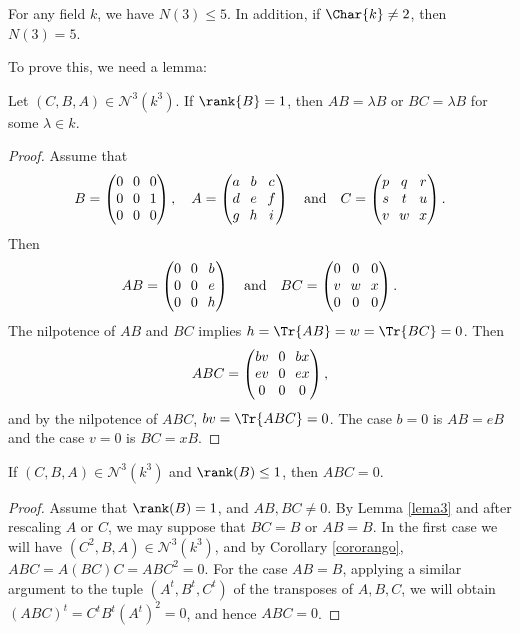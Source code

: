 \begin{prop}\label{casotres}
For any field $k$, we have $N(3)\leq 5$. In addition, if $\Char{k}\neq 2$, then $N(3)=5$.
\end{prop}
To prove this, we need a lemma:
\begin{lema}\label{lema3}
Let $(C,B,A)\in \mathcal{N}^{3}(k^{3})$. If $\rank{B}=1$, then $AB=\lambda B$ or $BC=\lambda B$ for some $\lambda \in k$.
\end{lema}
\begin{proof}
Assume that
\[\arraycolsep3.5pt
B=\begin{pmatrix}
0 & 0 & 0\\
0 & 0 & 1\\
0 & 0 & 0\\
\end{pmatrix},\quad A=\begin{pmatrix}
a & b & c\\
d & e & f\\
g & h & i\\
\end{pmatrix}\quad\text{and}\quad C=\begin{pmatrix}
p & q & r\\
s & t & u\\
v & w & x\\
\end{pmatrix}. 
\]
Then
\[\arraycolsep3.5pt
AB=\begin{pmatrix}
0 & 0 & b\\
0 & 0 & e\\
0 & 0 & h\\
\end{pmatrix}\quad\text{and}\quad BC=\begin{pmatrix}
0 & 0 & 0\\
v & w & x\\
0 & 0 & 0\\
\end{pmatrix}.
\]
The nilpotence of $AB$ and $BC$ implies $h=\Tr{AB}=w=\Tr{BC}=0$. Then
\[\arraycolsep3.5pt
ABC=\begin{pmatrix}
bv & 0 & bx\\
ev & 0 & ex\\
0 & 0 & 0\\
\end{pmatrix},
\]
and by the nilpotence of $ABC$, $bv=\Tr{ABC}=0$.
The case $b=0$ is $AB=eB$ and the case $v=0$ is $BC=xB$.
\end{proof}

\begin{coro}\label{cororango3}
If $(C,B,A) \in \mathcal{N}^{3}(k^{3})$ and $\rank(B)\leq 1$, then $ABC=0$.
\end{coro}
\begin{proof}
Assume that $\rank(B)=1$, and $AB, BC\neq 0$. By Lemma \ref{lema3} and after rescaling $A$ or $C$, we may suppose that $BC=B$ or $AB=B$. In the first case we will have $(C^2,B,A) \in \mathcal{N}^{3}(k^{3})$, and by Corollary \ref{cororango}, $ABC=A(BC)C=ABC^{2}=0$. For the case $AB=B$, applying a similar argument to the tuple $(A^{t},B^{t},C^{t})$ of the transposes of $A,B,C$, we will obtain $(ABC)^{t}=C^{t}B^{t}(A^{t})^{2}=0$, and hence \hbox{$ABC=0$}.
\end{proof}

